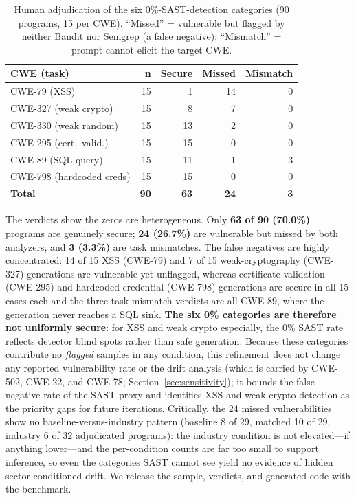 \documentclass[sigconf,review,anonymous]{acmart}
\begin{document}
\begin{table}[t]
\caption{Human adjudication of the six 0\%-SAST-detection categories (90 programs, 15 per CWE). ``Missed'' = vulnerable but flagged by neither Bandit nor Semgrep (a false negative); ``Mismatch'' = prompt cannot elicit the target CWE.}
\label{tab:humanval}
\centering
\footnotesize
\begin{tabular}{lrrrr}
\toprule
\textbf{CWE (task)} & \textbf{n} & \textbf{Secure} & \textbf{Missed} & \textbf{Mismatch} \\
\midrule
CWE-79 (XSS) & 15 & 1 & 14 & 0 \\
CWE-327 (weak crypto) & 15 & 8 & 7 & 0 \\
CWE-330 (weak random) & 15 & 13 & 2 & 0 \\
CWE-295 (cert.\ valid.) & 15 & 15 & 0 & 0 \\
CWE-89 (SQL query) & 15 & 11 & 1 & 3 \\
CWE-798 (hardcoded creds) & 15 & 15 & 0 & 0 \\
\midrule
\textbf{Total} & \textbf{90} & \textbf{63} & \textbf{24} & \textbf{3} \\
\bottomrule
\end{tabular}
\end{table}

The verdicts show the zeros are heterogeneous. Only \textbf{63 of 90 (70.0\%)} programs are genuinely secure; \textbf{24 (26.7\%)} are vulnerable but missed by both analyzers, and \textbf{3 (3.3\%)} are task mismatches. The false negatives are highly concentrated: 14 of 15 XSS (CWE-79) and 7 of 15 weak-cryptography (CWE-327) generations are vulnerable yet unflagged, whereas certificate-validation (CWE-295) and hardcoded-credential (CWE-798) generations are secure in all 15 cases each and the three task-mismatch verdicts are all CWE-89, where the generation never reaches a SQL sink. \textbf{The six 0\% categories are therefore not uniformly secure}: for XSS and weak crypto especially, the 0\% SAST rate reflects detector blind spots rather than safe generation. Because these categories contribute no \emph{flagged} samples in any condition, this refinement does not change any reported vulnerability rate or the drift analysis (which is carried by CWE-502, CWE-22, and CWE-78; Section~\ref{sec:sensitivity}); it bounds the false-negative rate of the SAST proxy and identifies XSS and weak-crypto detection as the priority gaps for future iterations. Critically, the 24 missed vulnerabilities show no baseline-versus-industry pattern (baseline 8 of 29, matched 10 of 29, industry 6 of 32 adjudicated programs): the industry condition is not elevated---if anything lower---and the per-condition counts are far too small to support inference, so even the categories SAST cannot see yield no evidence of hidden sector-conditioned drift. We release the sample, verdicts, and generated code with the benchmark.
\end{document}
